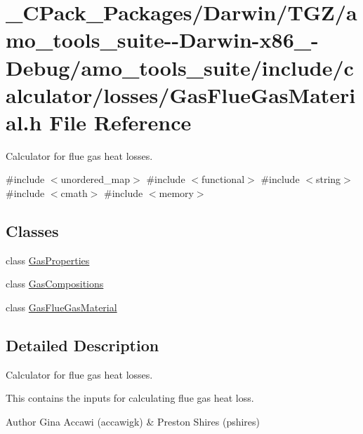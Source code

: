 \hypertarget{___c_pack___packages_2_darwin_2_t_g_z_2amo__tools__suite--_darwin-x86__64-_debug_2amo__tools__su9ff5b2af4c6b947df7e8e526d52d5430}{}\section{\+\_\+\+C\+Pack\+\_\+\+Packages/\+Darwin/\+T\+G\+Z/amo\+\_\+tools\+\_\+suite-\/-\/\+Darwin-\/x86\+\_-\/\+Debug/amo\+\_\+tools\+\_\+suite/include/calculator/losses/\+Gas\+Flue\+Gas\+Material.h File Reference}
\label{___c_pack___packages_2_darwin_2_t_g_z_2amo__tools__suite--_darwin-x86__64-_debug_2amo__tools__su9ff5b2af4c6b947df7e8e526d52d5430}


Calculator for flue gas heat losses.  


{\ttfamily \#include $<$unordered\+\_\+map$>$}\newline
{\ttfamily \#include $<$functional$>$}\newline
{\ttfamily \#include $<$string$>$}\newline
{\ttfamily \#include $<$cmath$>$}\newline
{\ttfamily \#include $<$memory$>$}\newline
\subsection*{Classes}
\begin{DoxyCompactItemize}
\item 
class \hyperlink{class_gas_properties}{Gas\+Properties}
\item 
class \hyperlink{class_gas_compositions}{Gas\+Compositions}
\item 
class \hyperlink{class_gas_flue_gas_material}{Gas\+Flue\+Gas\+Material}
\end{DoxyCompactItemize}


\subsection{Detailed Description}
Calculator for flue gas heat losses. 

This contains the inputs for calculating flue gas heat loss.

\begin{DoxyAuthor}{Author}
Gina Accawi (accawigk) \& Preston Shires (pshires) 
\end{DoxyAuthor}
